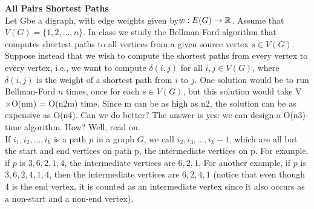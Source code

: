 \textbf{All Pairs Shortest Paths} \\
Let Gbe a digraph, with edge weights given by$w: E(G) \rightarrow \mathbb{R}$. Assume that $V(G) = \{1,2,\ldots,n\}$. In
class we study the Bellman-Ford algorithm that computes shortest paths to all vertices from a given
source vertex $s \in V(G)$. Suppose instead that we wish to compute the shortest paths from every vertex
to every vertex, i.e., we want to compute $\delta(i,j)$ for all $i,j \in V(G)$, where $\delta(i,j)$ is the weight of a
shortest path from $i$ to $j$. One solution would be to run Bellman-Ford $n$ times, once for each $s \in V(G)$,
but this solution would take V ×O(nm) = O(n2m) time. Since m can be as high as n2, the solution
can be as expensive as O(n4). Can we do better? The answer is yes: we can design a O(n3)-time
algorithm. How? Well, read on. \\

If $i_1,i_2,\ldots, i_k$ is a path $p$ in a graph $G$, we call $i_2,i_3,\ldots,i_k-1$, which are all but the start and end
vertices on path p, the intermediate vertices on p. For example, if $p$ is $3, 6, 2, 1, 4$, the intermediate
vertices are $6, 2, 1$. For another example, if $p$ is $3, 6, 2, 4, 1, 4$, then the intermediate vertices are $6, 2,
4, 1$ (notice that even though 4 is the end vertex, it is counted as an intermediate vertex since it also
occurs as a non-start and a non-end vertex).

